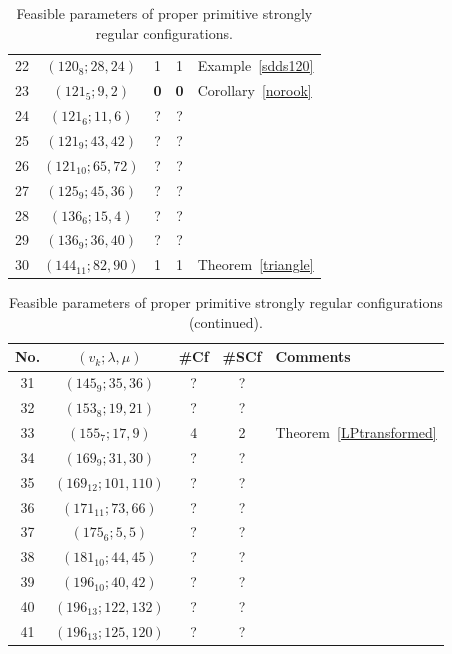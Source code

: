\documentclass[12pt, reqno]{amsart}
\begin{document}
\begin{table}
\begin{center}
\begin{tabular}{|c c c c l|}
\rule{0mm}{4.5mm}22 & $(120_{8};28,24)$ & 1 & 1 & Example~\ref{sdds120}\\
\rule{0mm}{4.5mm}23 & $(121_{5};9,2)$ & \textbf{0} & \textbf{0} & Corollary~\ref{norook} \\
\rule{0mm}{4.5mm}24 & $(121_{6};11,6)$ & ? & ? & \\
\rule{0mm}{4.5mm}25 & $(121_{9};43,42)$ & ? & ? & \\
\rule{0mm}{4.5mm}26 & $(121_{10};65,72)$ & ? & ? & \\
\rule{0mm}{4.5mm}27 & $(125_{9};45,36)$ & ? & ? & \\
\rule{0mm}{4.5mm}28 & $(136_{6};15,4)$ & ? & ? & \\
\rule{0mm}{4.5mm}29 & $(136_{9};36,40)$ & ? & ? & \\
\rule{0mm}{4.5mm}30 & $(144_{11};82,90)$ & 1 & 1 & Theorem~\ref{triangle}\\
\hline
\end{tabular}
\end{center}
\vskip 3mm \caption{Feasible parameters of proper primitive strongly regular
configurations.}\label{fptable}
\end{table}

\addtocounter{table}{-1}

\begin{table}
\begin{center}
\begin{tabular}{|c c c c l|}
\hline
No. & $(v_k;\lambda,\mu)$ & \#Cf & \#SCf & Comments\\
\hline
\rule{0mm}{4.5mm}31 & $(145_{9};35,36)$ & ? & ? & \\
\rule{0mm}{4.5mm}32 & $(153_{8};19,21)$ & ? & ? & \\
\rule{0mm}{4.5mm}33 & $(155_{7};17,9)$ & 4 & 2 & Theorem~\ref{LPtransformed}\\
\rule{0mm}{4.5mm}34 & $(169_{9};31,30)$ & ? & ? & \\
\rule{0mm}{4.5mm}35 & $(169_{12};101,110)$ & ? & ? & \\
\rule{0mm}{4.5mm}36 & $(171_{11};73,66)$ & ? & ? & \\
\rule{0mm}{4.5mm}37 & $(175_{6};5,5)$ & ? & ? & \\
\rule{0mm}{4.5mm}38 & $(181_{10};44,45)$ & ? & ? & \\
\rule{0mm}{4.5mm}39 & $(196_{10};40,42)$ & ? & ? & \\
\rule{0mm}{4.5mm}40 & $(196_{13};122,132)$ & ? & ? & \\
\rule{0mm}{4.5mm}41 & $(196_{13};125,120)$ & ? & ? & \\
\hline
\end{tabular}
\end{center}
\vskip 3mm \caption{Feasible parameters of proper primitive strongly regular
configurations (continued).}
\end{table}
\end{document}
